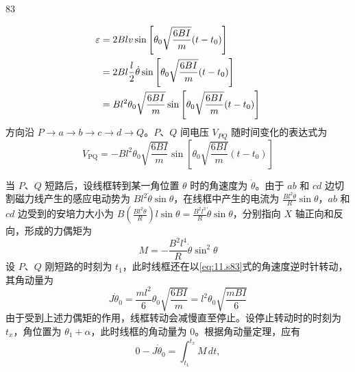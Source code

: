 \begin{solution}{83}
\begin{subsolution}
\begin{subsubsolution}
            \begin{align}
                \varepsilon &= 2 B l v \sin\left[ \theta_{0} \sqrt{\frac{6 B I}{m}} (t-t_{0}) \right] \notag\\
                &= 2 B l \frac{l}{2} \dot{\theta} \sin\left[ \theta_{0} \sqrt{\frac{6 B I}{m}} (t-t_{0}) \right] \notag\\
                &= B l^{2} \theta_{0} \sqrt{\frac{6 B I}{m}} \sin\left[ \theta_{0} \sqrt{\frac{6 B I}{m}} (t-t_{0}) \right]
                \label{eq:13.s83}
            \end{align}
            方向沿 $P\rightarrow a\rightarrow b\rightarrow c\rightarrow d\rightarrow Q$。$P$、$Q$ 间电压 $V_{PQ}$ 随时间变化的表达式为
            \begin{equation}
                V_{\mathrm{PQ}} = - B l^{2} \theta_{0} \sqrt{\frac{6 B I}{m}} \sin\left[ \theta_{0} \sqrt{\frac{6 B I}{m}} (t-t_{0}) \right]
                \label{eq:14.s83}
            \end{equation}
        \end{subsubsolution}
        \begin{subsubsolution}
            当 $P$、$Q$ 短路后，设线框转到某一角位置 $\theta$ 时的角速度为 $\dot{\theta}$。由于 $ab$ 和 $cd$ 边切割磁力线产生的感应电动势为 $B l^{2} \dot{\theta} \sin\theta$，在线框中产生的电流为 $\frac{B l^{2} \dot{\theta}}{R} \sin\theta$，$ab$ 和 $cd$ 边受到的安培力大小为 $B\left(\frac{B l^{2} \dot{\theta}}{R}\right) l \sin\theta = \frac{B^{2} l^{3}}{R} \dot{\theta} \sin\theta$，分别指向 $X$ 轴正向和反向，形成的力偶矩为
            \begin{equation}
                M = - \frac{B^{2} l^{4}}{R} \dot{\theta} \sin^{2} \theta
                \label{eq:15.s83}
            \end{equation}
            设 $P$、$Q$ 刚短路的时刻为 $t_{1}$，此时线框还在以\eqref{eq:11.s83}式的角速度逆时针转动，其角动量为
            \begin{equation}
                J \dot{\theta}_{0} = \frac{m l^{2}}{6} \theta_{0} \sqrt{\frac{6 B I}{m}} = l^{2} \theta_{0} \sqrt{\frac{m B I}{6}}
                \label{eq:16.s83}
            \end{equation}
            由于受到上述力偶矩的作用，线框转动会减慢直至停止。设停止转动时的时刻为 $t_{x}$，角位置为 $\theta_{1}+\alpha$，此时线框的角动量为 $0$。根据角动量定理，应有
            \begin{equation}
                0 - J \dot{\theta}_{0} = \int_{t_{1}}^{t_{x}} M \,dt,
                \label{eq:17.s83}

\end{equation}
\end{subsubsolution}
\end{subsolution}
\end{solution}
